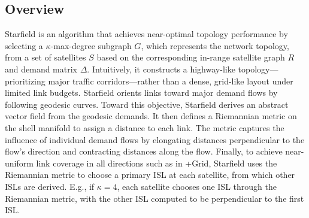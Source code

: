 \documentclass[acmsmall, screen]{acmart}
\begin{document}
\subsection{Overview}\label{design:overview}
Starfield is an algorithm that achieves near-optimal topology performance by selecting a $\kappa$-max-degree subgraph $G$, which represents the network topology, from a set of satellites $S$ based on the corresponding in-range satellite graph $R$ and demand matrix $\Delta$. Intuitively, it constructs a highway-like topology—prioritizing major traffic corridors—rather than a dense, grid-like layout under limited link budgets. Starfield orients links toward major demand flows by following geodesic curves. Toward this objective, Starfield derives an abstract vector field from the geodesic demands. It then defines a Riemannian metric on the shell manifold to assign a distance to each link. The metric captures the influence of individual demand flows by elongating distances perpendicular to the flow's direction and contracting distances along the flow. Finally, to achieve near-uniform link coverage in all directions such as in +Grid, Starfield uses the Riemannian metric to choose a primary ISL at each satellite, from which other ISLs are derived. E.g., if $\kappa = 4$, each satellite chooses one ISL through the Riemannian metric, with the other ISL computed to be perpendicular to the first ISL. 
\end{document}
